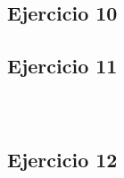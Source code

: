 \documentclass[10pt,a4paper]{article}
\begin{document}
\subsubsection{}
    \begin{lstlisting}
    \end{lstlisting}
\subsection{Ejercicio 10}
\subsection{Ejercicio 11}
\subsubsection{}
    \begin{lstlisting}
    \end{lstlisting}
\subsubsection{}
    \begin{lstlisting}
    \end{lstlisting}
\subsection{Ejercicio 12}
\subsubsection{}
    \begin{lstlisting}
    \end{lstlisting}
\subsubsection{}
    \begin{lstlisting}
    \end{lstlisting}
\subsubsection{}
    \begin{lstlisting}
    \end{lstlisting}
\subsubsection{}
    \begin{lstlisting}
    \end{lstlisting}
\end{document}
